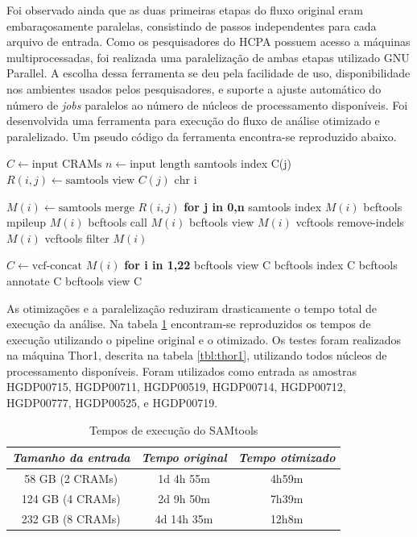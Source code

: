 \documentclass[cic,tc]{iiufrgs}
\begin{document}
Foi observado ainda que as duas primeiras etapas do fluxo original eram
embaraçosamente paralelas, consistindo de passos independentes para cada
arquivo de entrada.  Como os pesquisadores do HCPA possuem acesso a máquinas
multiprocessadas, foi realizada uma paralelização de ambas etapas utilizado GNU
Parallel\cite{tange_ole_2021_5233953}. A escolha dessa ferramenta se deu pela
facilidade de uso, disponibilidade nos ambientes usados pelos pesquisadores, e
suporte a ajuste automático do número de \textit{jobs} paralelos ao número de
núcleos de processamento disponíveis. Foi desenvolvida uma ferramenta para
execução do fluxo de análise otimizado e paralelizado. Um pseudo código da
ferramenta encontra-se reproduzido abaixo.

\begin{algorithmic}
  \State $C \gets \text{input CRAMs}$
  \State $n \gets \text{input length}$
  \State samtools index C(j)
    \State $R(i,j) \gets \text{samtools view } C(j) \text{ chr i}$
  \EndFor
\EndFor

  \State $M(i) \gets \text{samtools merge } R(i,j)$ \textbf{for j in 0,n}
  \State samtools index $M(i)$
  \State bcftools mpileup $M(i)$
  \State bcftools call $M(i)$
  \State bcftools view $M(i)$
  \State vcftools remove-indels $M(i)$
  \State vcftools filter $M(i)$
\EndFor

\State $C \gets \text{vcf-concat } M(i)$ \textbf{for i in 1,22}
\State bcftools view C
\State bcftools index C
\State bcftools annotate C
\State bcftools view C
\end{algorithmic}

As otimizações e a paralelização reduziram drasticamente o tempo total de
execução da análise. Na tabela \ref{tbl:SAMtools} encontram-se reproduzidos os
tempos de execução utilizando o pipeline original e o otimizado. Os testes
foram realizados na máquina Thor1, descrita na tabela \ref{tbl:thor1},
utilizando todos núcleos de processamento disponíveis. Foram utilizados como
entrada as amostras HGDP00715, HGDP00711, HGDP00519, HGDP00714, HGDP00712,
HGDP00777, HGDP00525, e HGDP00719.

\begin{table}[h]
    \caption{Tempos de execução do SAMtools}
    \centering
        \begin{tabular}{c|c|c}
          \hline
          \textit{Tamanho da entrada}  &   \textit{Tempo original}  & \textit{Tempo otimizado} \\
          \hline
          \hline
          58 GB (2 CRAMs) & 1d 4h 55m & 4h59m \\
          124 GB (4 CRAMs) & 2d 9h 50m & 7h39m \\
          232 GB (8 CRAMs) & 4d 14h 35m & 12h8m \\
          \hline
        \end{tabular}
    \label{tbl:SAMtools}
\end{table}
\end{document}

